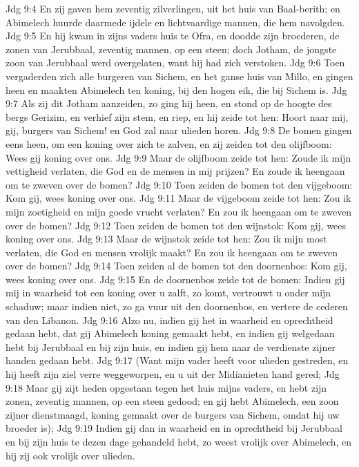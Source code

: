 Jdg 9:4  En zij gaven hem zeventig zilverlingen, uit het huis van Baal-berith; en Abimelech huurde daarmede ijdele en lichtvaardige mannen, die hem navolgden.
Jdg 9:5  En hij kwam in zijns vaders huis te Ofra, en doodde zijn broederen, de zonen van Jerubbaal, zeventig mannen, op een steen; doch Jotham, de jongste zoon van Jerubbaal werd overgelaten, want hij had zich verstoken.
Jdg 9:6  Toen vergaderden zich alle burgeren van Sichem, en het ganse huis van Millo, en gingen heen en maakten Abimelech ten koning, bij den hogen eik, die bij Sichem is.
Jdg 9:7  Als zij dit Jotham aanzeiden, zo ging hij heen, en stond op de hoogte des bergs Gerizim, en verhief zijn stem, en riep, en hij zeide tot hen: Hoort naar mij, gij, burgers van Sichem! en God zal naar ulieden horen.
Jdg 9:8  De bomen gingen eens heen, om een koning over zich te zalven, en zij zeiden tot den olijfboom: Wees gij koning over ons.
Jdg 9:9  Maar de olijfboom zeide tot hen: Zoude ik mijn vettigheid verlaten, die God en de mensen in mij prijzen? En zoude ik heengaan om te zweven over de bomen?
Jdg 9:10  Toen zeiden de bomen tot den vijgeboom: Kom gij, wees koning over ons.
Jdg 9:11  Maar de vijgeboom zeide tot hen: Zou ik mijn zoetigheid en mijn goede vrucht verlaten? En zou ik heengaan om te zweven over de bomen?
Jdg 9:12  Toen zeiden de bomen tot den wijnstok: Kom gij, wees koning over ons.
Jdg 9:13  Maar de wijnstok zeide tot hen: Zou ik mijn most verlaten, die God en mensen vrolijk maakt? En zou ik heengaan om te zweven over de bomen?
Jdg 9:14  Toen zeiden al de bomen tot den doornenbos: Kom gij, wees koning over ons.
Jdg 9:15  En de doornenbos zeide tot de bomen: Indien gij mij in waarheid tot een koning over u zalft, zo komt, vertrouwt u onder mijn schaduw; maar indien niet, zo ga vuur uit den doornenbos, en vertere de cederen van den Libanon.
Jdg 9:16  Alzo nu, indien gij het in waarheid en oprechtheid gedaan hebt, dat gij Abimelech koning gemaakt hebt, en indien gij welgedaan hebt bij Jerubbaal en bij zijn huis, en indien gij hem naar de verdienste zijner handen gedaan hebt.
Jdg 9:17  (Want mijn vader heeft voor ulieden gestreden, en hij heeft zijn ziel verre weggeworpen, en u uit der Midianieten hand gered;
Jdg 9:18  Maar gij zijt heden opgestaan tegen het huis mijns vaders, en hebt zijn zonen, zeventig mannen, op een steen gedood; en gij hebt Abimelech, een zoon zijner dienstmaagd, koning gemaakt over de burgers van Sichem, omdat hij uw broeder is);
Jdg 9:19  Indien gij dan in waarheid en in oprechtheid bij Jerubbaal en bij zijn huis te dezen dage gehandeld hebt, zo weest vrolijk over Abimelech, en hij zij ook vrolijk over ulieden.
